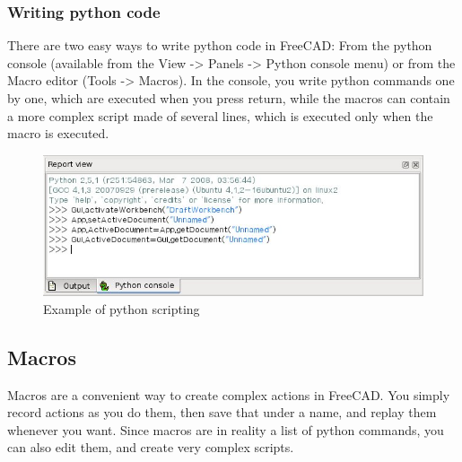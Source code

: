 \subsubsection{Writing python code}
There are two easy ways to write python code in FreeCAD: From the python 
console (available from the View -> Panels -> Python console menu) or from 
the Macro editor (Tools -> Macros). In the console, you write python commands 
one by one, which are executed when you press return, while the macros can 
contain a more complex script made of several lines, which is executed only 
when the macro is executed.
\begin{figure}[h!]                                                       
\begin{center}                                                          
\includegraphics[scale=0.5]{images/Screenshot_pythoninterpreter.jpg}                     
\caption{Example of python scripting}
\end{center}
\end{figure} 

\subsection{Macros}
Macros are a convenient way to create complex actions in FreeCAD. You simply 
record actions as you do them, then save that under a name, and replay them 
whenever you want. Since macros are in reality a list of python commands, 
you can also edit them, and create very complex scripts.

